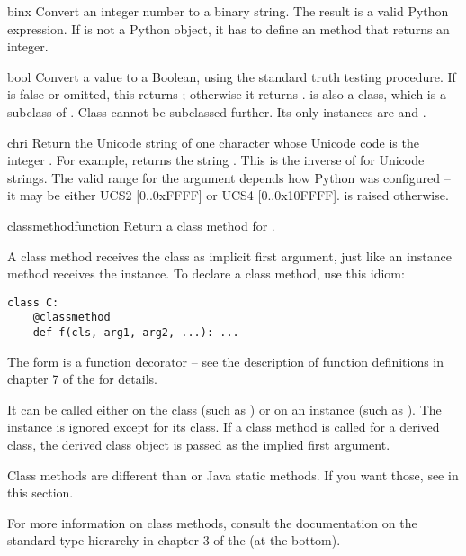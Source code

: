 \begin{funcdesc}{bin}{x}
  Convert an integer number to a binary string.
  The result is a valid Python expression.  If  is not a Python
   object, it has to define an  method
  that returns an integer.
\end{funcdesc}

\begin{funcdesc}{bool}{}
  Convert a value to a Boolean, using the standard truth testing
  procedure.  If  is false or omitted, this returns
  ; otherwise it returns .
   is also a class, which is a subclass of .
  Class  cannot be subclassed further.  Its only instances
  are  and .

\end{funcdesc}

\begin{funcdesc}{chr}{i}
  Return the Unicode string of one character whose Unicode code is the
  integer .  For example,  returns the string
  .  This is the inverse of  for Unicode
  strings.  The valid range for the argument depends how Python was
  configured -- it may be either UCS2 [0..0xFFFF] or UCS4 [0..0x10FFFF].
   is raised otherwise.
\end{funcdesc}

\begin{funcdesc}{classmethod}{function}
  Return a class method for .

  A class method receives the class as implicit first argument,
  just like an instance method receives the instance.
  To declare a class method, use this idiom:

\begin{verbatim}
class C:
    @classmethod
    def f(cls, arg1, arg2, ...): ...
\end{verbatim}

  The  form is a function decorator -- see the description
  of function definitions in chapter 7 of the
   for details.

  It can be called either on the class (such as ) or on an
  instance (such as ).  The instance is ignored except for
  its class.
  If a class method is called for a derived class, the derived class
  object is passed as the implied first argument.

  Class methods are different than \Cpp{} or Java static methods.
  If you want those, see  in this section.
  
  For more information on class methods, consult the documentation on the
  standard type hierarchy in chapter 3 of the
   (at the bottom).
\end{funcdesc}


